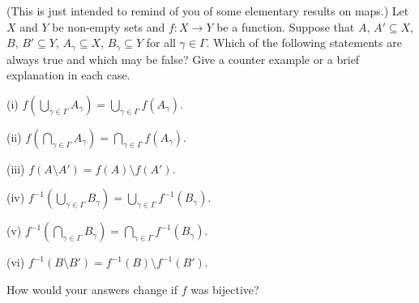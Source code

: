 \begin{exercise}\label{E;inverse} 
(This is just intended
to remind of you of some elementary results on maps.)
Let $X$ and $Y$ be non-empty sets and $f:X\rightarrow Y$
be a function. Suppose that $A,\,A'\subseteq X$, $B,\,B'\subseteq Y$,
$A_{\gamma}\subseteq X$, $B_{\gamma}\subseteq Y$
for all $\gamma\in\Gamma$. Which of the following statements
are always true and which may be false?
Give a counter example or a brief explanation in each case.


(i) $f(\bigcup_{\gamma\in\Gamma}A_{\gamma})
= \bigcup_{\gamma\in\Gamma}f(A_{\gamma})$.

(ii) $f(\bigcap_{\gamma\in\Gamma}A_{\gamma})
= \bigcap_{\gamma\in\Gamma}f(A_{\gamma})$.

(iii) $f(A\setminus A')=f(A)\setminus f(A')$.

(iv) $f^{-1}(\bigcup_{\gamma\in\Gamma}B_{\gamma})
= \bigcup_{\gamma\in\Gamma}f^{-1}(B_{\gamma})$.

(v) $f^{-1}(\bigcap_{\gamma\in\Gamma}B_{\gamma})
= \bigcap_{\gamma\in\Gamma}f^{-1}(B_{\gamma})$.

(vi) $f^{-1}(B\setminus B')=f^{-1}(B)\setminus f^{-1}(B')$.

How would your answers change if $f$ was bijective?
\end{exercise}
